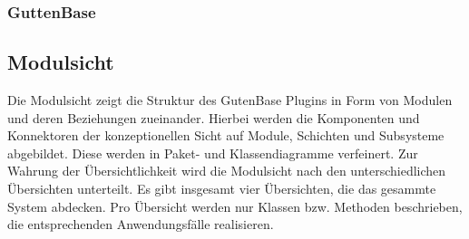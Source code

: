 \subsubsection{GuttenBase}




\subsection{Modulsicht}
Die Modulsicht zeigt die Struktur des GutenBase Plugins in Form von Modulen und deren Beziehungen zueinander. Hierbei werden die Komponenten und Konnektoren der konzeptionellen Sicht auf Module, Schichten und Subsysteme abgebildet. Diese werden in Paket- und Klassendiagramme verfeinert.
Zur Wahrung der Übersichtlichkeit wird die Modulsicht nach den unterschiedlichen Übersichten unterteilt. Es gibt insgesamt vier Übersichten, die das gesammte System abdecken. Pro Übersicht werden nur Klassen bzw. Methoden beschrieben, die entsprechenden Anwendungsfälle realisieren.

